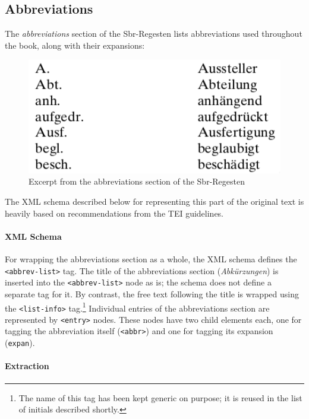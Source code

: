 \subsection{Abbreviations}
\label{sec:abbrevs}

The \emph{abbreviations} section of the Sbr-Regesten lists
abbreviations used throughout the book, along with their expansions:

\begin{figure}[h]
  \centering
  \includegraphics[width=1.0\textwidth]{img/abbrevs}
  \caption{Excerpt from the abbreviations section of the Sbr-Regesten}
  \label{fig:abbrevs}
\end{figure}

The XML schema described below for representing this part of the
original text is heavily based on recommendations from the TEI
guidelines.

\paragraph{XML Schema}

For wrapping the abbreviations section as a whole, the XML schema
defines the \texttt{<abbrev-list>} tag. The title of the abbreviations
section (\emph{Abkürzungen}) is inserted into the
\texttt{<abbrev-list>} node as is; the schema does not define a
separate tag for it. By contrast, the free text following the title is
wrapped using the \texttt{<list-info>} tag.\footnote{The name of this
  tag has been kept generic on purpose; it is reused in the list of
  initials described shortly.} Individual entries of the abbreviations
section are represented by \texttt{<entry>} nodes. These nodes have
two child elements each, one for tagging the abbreviation itself
(\texttt{<abbr>}) and one for tagging its expansion (\texttt{expan}).

\paragraph{Extraction}

